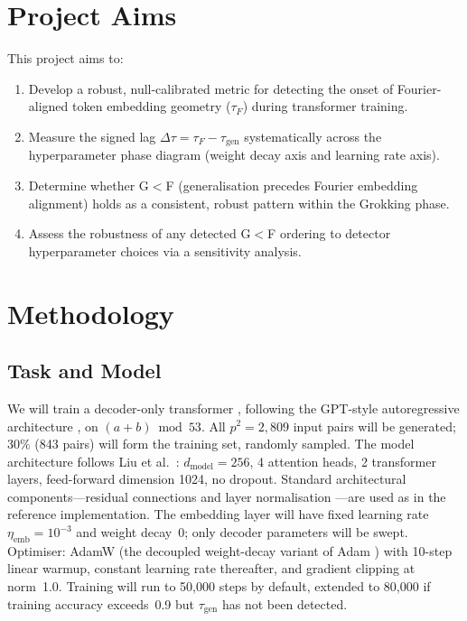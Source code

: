 \documentclass[12pt,openany,a4paper]{book}
\newcommand{\taug}{\tau_{\mathrm{gen}}}
\newcommand{\tauf}{\tau_{F}}
\newcommand{\Dtau}{\Delta\tau}
\begin{document}
\section{Project Aims}

This project aims to:
\begin{enumerate}
  \item Develop a robust, null-calibrated metric for detecting the
    onset of Fourier-aligned token embedding geometry ($\tauf$) during
    transformer training.
  \item Measure the signed lag $\Dtau = \tauf - \taug$ systematically
    across the hyperparameter phase diagram (weight decay axis and
    learning rate axis).
  \item Determine whether G$<$F (generalisation precedes Fourier
    embedding alignment) holds as a consistent, robust pattern within
    the Grokking phase.
  \item Assess the robustness of any detected G$<$F ordering to
    detector hyperparameter choices via a sensitivity analysis.
\end{enumerate}

\section{Methodology}

\subsection{Task and Model}

We will train a decoder-only transformer \cite{vaswani2017attention},
following the GPT-style autoregressive architecture
\cite{radford2018gpt}, on $(a+b)\bmod 53$.
All $p^2 = 2{,}809$ input pairs will be generated; 30\% (843 pairs)
will form the training set, randomly sampled.
The model architecture follows Liu et al.\ \cite{liu2022towards}:
$d_{\mathrm{model}}=256$, 4 attention heads, 2 transformer layers,
feed-forward dimension 1024, no dropout.
Standard architectural components---residual connections
\cite{he2016resnet} and layer normalisation \cite{ba2016layernorm}---are
used as in the reference implementation.
The embedding layer will have fixed learning rate $\eta_{\mathrm{emb}}
= 10^{-3}$ and weight decay~0; only decoder parameters will be swept.
Optimiser: AdamW \cite{loshchilov2019adamw} (the decoupled
weight-decay variant of Adam \cite{kingma2015adam}) with 10-step
linear warmup, constant learning rate thereafter, and gradient
clipping at norm~1.0.
Training will run to 50{,}000 steps by default, extended to 80{,}000
if training accuracy exceeds~0.9 but $\taug$ has not been detected.
\end{document}
